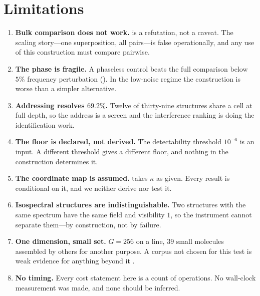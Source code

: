 \documentclass[11pt,twocolumn,a4paper]{article}
\theoremstyle{upthm}
\theoremstyle{definition}
\theoremstyle{remark}
\begin{document}
\section{Limitations}
\label{sec:limits}

\begin{enumerate}[label=\textbf{L\arabic*.},leftmargin=2.8em,itemsep=4pt]

\item \textbf{Bulk comparison does not work.}  is a
refutation, not a caveat. The scaling story---one superposition, all
pairs---is false operationally, and any use of this construction must
compare pairwise.

\item \textbf{The phase is fragile.} A phaseless control beats the full
comparison below $5\%$ frequency perturbation ().
In the low-noise regime the construction is worse than a simpler
alternative.

\item \textbf{Addressing resolves $69.2\%$.} Twelve of thirty-nine
structures share a cell at full depth, so the address is a screen and
the interference ranking is doing the identification work.

\item \textbf{The floor is declared, not derived.} The detectability
threshold $10^{-6}$ is an input. A different threshold gives a different
floor, and nothing in the construction determines it.

\item \textbf{The coordinate map is assumed.}  takes
$\kappa$ as given. Every result is conditional on it, and we neither
derive nor test it.

\item \textbf{Isospectral structures are indistinguishable.} Two
structures with the same spectrum have the same field and visibility $1$,
so the instrument cannot separate them---by construction, not by
failure.

\item \textbf{One dimension, small set.} $G=256$ on a line, $39$ small
molecules assembled by others for another purpose. A corpus not chosen
for this test is weak evidence for anything beyond it
\citep{ioannidis2005}.

\item \textbf{No timing.} Every cost statement here is a count of
operations. No wall-clock measurement was made, and none should be
inferred.
\end{enumerate}
\end{document}
